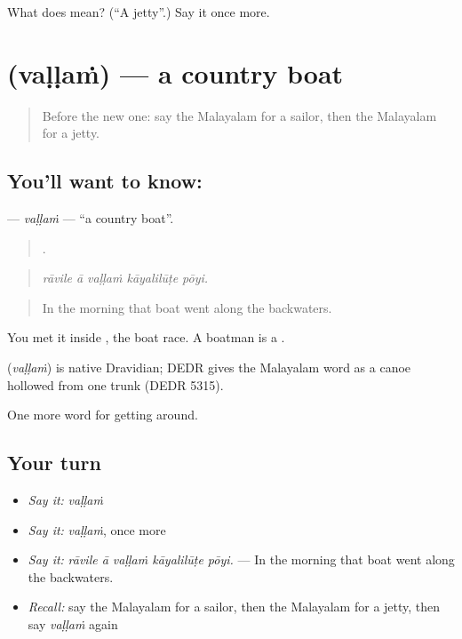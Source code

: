 \begin{tcolorbox}[breakable,colback=teal!4,colframe=teal!35!black,title={Before you move on}]
What does  mean? (\textquotedblleft{}A jetty\textquotedblright{}.) Say it once more.
\end{tcolorbox}
\section[\texorpdfstring{\ml{വള്ളം} (vaḷḷaṁ)}{വള്ളം (vaḷḷaṁ)}]{ (vaḷḷaṁ) — a country boat}

\label{lesson:ML-C475-vallam}



\begin{quote}
Before the new one: say the Malayalam for a sailor, then the Malayalam for a jetty.
\end{quote}

\subsection*{You'll want to know: }
\textbf{} — \emph{vaḷḷaṁ} — \textquotedblleft{}a country boat\textquotedblright{}.

\begin{quote}
    .
\end{quote}

\begin{quote}
\emph{rāvile ā vaḷḷaṁ kāyalilūṭe pōyi.}
\end{quote}

\begin{quote}
In the morning that boat went along the backwaters.
\end{quote}

You met it inside , the boat race. A boatman is a .

\begin{cousinweb}
\textbf{} (\emph{vaḷḷaṁ}) is native Dravidian; DEDR gives the Malayalam word as a canoe hollowed from one trunk (DEDR 5315).
\end{cousinweb}

\begin{grammarlens}[title={What you've built}]
One more word for getting around.
\end{grammarlens}

\subsection*{Your turn}
\begin{itemize}
\raggedright
  \item \emph{Say it:} \emph{vaḷḷaṁ}
  \item \emph{Say it:} \emph{vaḷḷaṁ}, once more
  \item \emph{Say it:} \emph{rāvile ā vaḷḷaṁ kāyalilūṭe pōyi.} — In the morning that boat went along the backwaters.
  \item \emph{Recall:} say the Malayalam for a sailor, then the Malayalam for a jetty, then say \emph{vaḷḷaṁ} again
\end{itemize}

